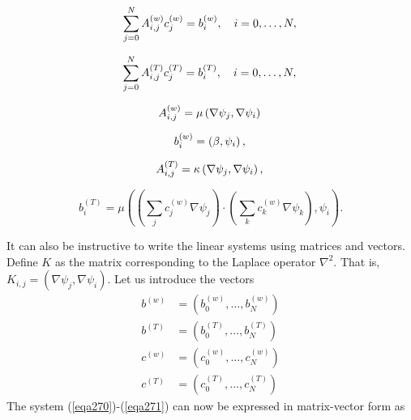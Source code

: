 \documentclass[../main.tex]{subfiles}
\begin{document}
		\begin{equation}
			\label{eqa270}
			\sum_{j=0}^{N} A_{i, j}^{(w)} c_{j}^{(w)}=b_{i}^{(w)}, \quad i=0, \ldots, N, \\
		\end{equation}
	
		\begin{equation}
			\label{eqa271}
			\sum_{j=0}^{N} A_{i, j}^{(T)} c_{j}^{(T)}=b_{i}^{(T)}, \quad i=0, \ldots, N, \\
		\end{equation}
	
		\begin{equation}
			\label{eqa272}
			A_{i, j}^{(w)} =\mu\left(\nabla \psi_{j}, \nabla \psi_{i}\right) \\
		\end{equation}
	
		\begin{equation}
			\label{eqa273}
			b_{i}^{(w)} =\left(\beta, \psi_{i}\right), \\
		\end{equation}
	
		\begin{equation}
			\label{eqa274}
			A_{i, j}^{(T)} =\kappa\left(\nabla \psi_{j}, \nabla \psi_{i}\right), \\
		\end{equation}
	
		\begin{equation}
			\label{eqa275}
			b_{i}^{(T)} =\mu\left(\left(\sum_{j} c_{j}^{(w)} \nabla \psi_{j}\right) \cdot\left(\sum_{k} c_{k}^{(w)} \nabla \psi_{k}\right), \psi_{i}\right) .
		\end{equation}
	
		It can also be instructive to write the linear systems using matrices and vectors. Define $K$ as the matrix corresponding to the Laplace operator $\nabla^{2}$. That is, $K_{i, j}=\left(\nabla \psi_{j}, \nabla \psi_{i}\right)$. Let us introduce the vectors
		$$
		\begin{aligned}
			b^{(w)} &=\left(b_{0}^{(w)}, \ldots, b_{N}^{(w)}\right) \\
			b^{(T)} &=\left(b_{0}^{(T)}, \ldots, b_{N}^{(T)}\right) \\
			c^{(w)} &=\left(c_{0}^{(w)}, \ldots, c_{N}^{(w)}\right) \\
			c^{(T)} &=\left(c_{0}^{(T)}, \ldots, c_{N}^{(T)}\right)
		\end{aligned}
		$$
		The system (\ref{eqa270})-(\ref{eqa271}) can now be expressed in matrix-vector form as
		
\end{document}
